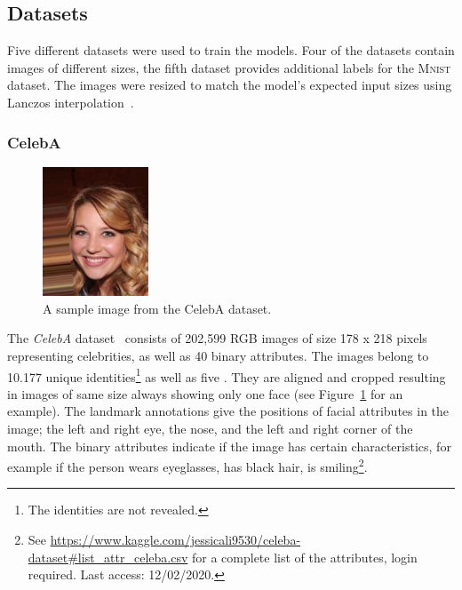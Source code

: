 \subsection{Datasets}\label{subsec:datasets}

Five different datasets were used to train the models.
Four of the datasets contain images of different sizes, the fifth dataset provides additional labels for the \textsc{Mnist} dataset.
The images were resized to match the model's expected input sizes using Lanczos interpolation~\citep[pp. 223, ff]{burger2009principles}.

\subsubsection{CelebA}\label{subsubsec:celeba_dataset}

\begin{figure}
    \begin{center}
        \includegraphics[width=0.28\textwidth]{images/celeba_sample_63.jpg}
    \end{center}
    \caption[CelebA dataset sample image]{A sample image from the CelebA dataset.}
    \label{fig:celeba_sample}
\end{figure}

The \textit{CelebA} dataset~\citep{liu2015faceattributes} consists of 202,599 RGB images of size 178 x 218 pixels representing celebrities, as well as 40 binary attributes.
The images belong to 10.177 unique identities\footnote{The identities are not revealed.} as well as five .
They are aligned and cropped resulting in images of same size always showing only one face (see Figure~\ref{fig:celeba_sample} for an example).
The landmark annotations give the positions of facial attributes in the image; the left and right eye, the nose, and the left and right corner of the mouth.
The binary attributes indicate if the image has certain characteristics, for example if the person wears eyeglasses, has black hair, is smiling\footnote{See \href{https://www.kaggle.com/jessicali9530/celeba-dataset\#list\_attr\_celeba.csv}{https://www.kaggle.com/jessicali9530/celeba-dataset\#list\_attr\_celeba.csv} for a complete list of the attributes, login required. Last access: 12/02/2020.}.

